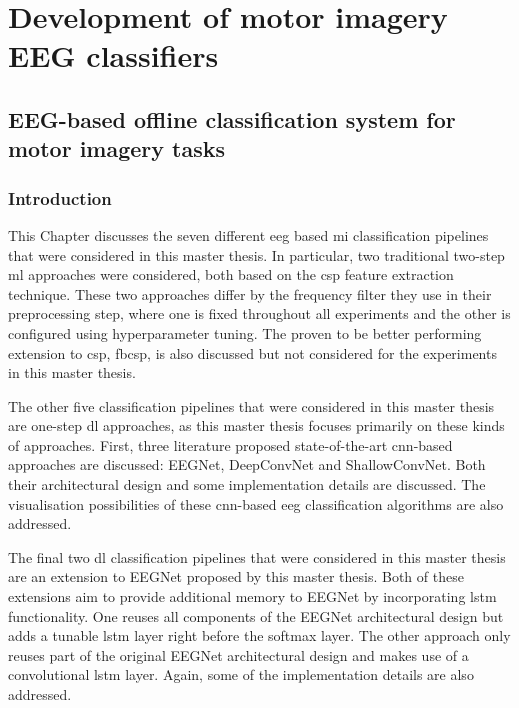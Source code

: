 

\part{Development of motor imagery EEG classifiers}
\label{part:development}

\chapter{EEG-based offline classification system for motor imagery tasks}
\label{ch:offline_bci_system}

\section{Introduction}
\label{sec:offline_bci_system_introduction}

This Chapter discusses the seven different \gls{eeg} based \gls{mi} classification pipelines that were considered in this master thesis.
In particular, two traditional two-step \gls{ml} approaches were considered, both based on the \gls{csp} feature extraction technique.
These two approaches differ by the frequency filter they use in their preprocessing step, where one is fixed throughout all experiments and the other is configured using hyperparameter tuning.
The proven to be better performing extension to \gls{csp}, \gls{fbcsp}, is also discussed but not considered for the experiments in this master thesis.

The other five classification pipelines that were considered in this master thesis are one-step \gls{dl} approaches, as this master thesis focuses primarily on these kinds of approaches.
First, three literature proposed state-of-the-art \gls{cnn}-based approaches are discussed: EEGNet, Deep\-Conv\-Net and ShallowConvNet.
Both their architectural design and some implementation details are discussed.
The visualisation possibilities of these \gls{cnn}-based \gls{eeg} classification algorithms are also addressed.

The final two \gls{dl} classification pipelines that were considered in this master thesis are an extension to EEGNet proposed by this master thesis.
Both of these extensions aim to provide additional memory to EEGNet by incorporating \gls{lstm} functionality. 
One reuses all components of the EEGNet architectural design but adds a tunable \gls{lstm} layer right before the softmax layer.
The other approach only reuses part of the original EEGNet architectural design and makes use of a convolutional \gls{lstm} layer.
Again, some of the implementation details are also addressed.

